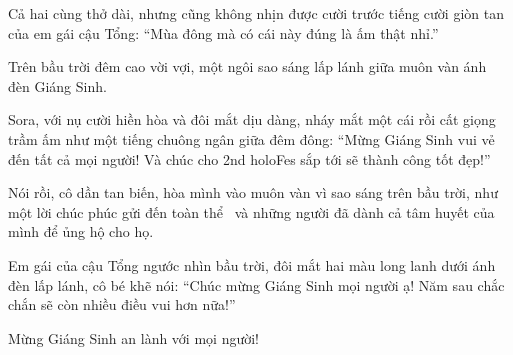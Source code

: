 \documentclass[../main.tex]{subfiles}
\begin{document}
Cả hai cùng thở dài, nhưng cũng không nhịn được cười trước tiếng cười giòn tan của em gái cậu Tổng: ``Mùa đông mà có cái này đúng là ấm thật nhỉ.''

Trên bầu trời đêm cao vời vợi, một ngôi sao sáng lấp lánh giữa muôn vàn ánh đèn Giáng Sinh.

Sora, với nụ cười hiền hòa và đôi mắt dịu dàng, nháy mắt một cái rồi cất giọng trầm ấm như một tiếng chuông ngân giữa đêm đông: ``Mừng Giáng Sinh vui vẻ đến tất cả mọi người! Và chúc cho 2nd holoFes sắp tới sẽ thành công tốt đẹp!''


Nói rồi, cô dần tan biến, hòa mình vào muôn vàn vì sao sáng trên bầu trời, như một lời chúc phúc gửi đến toàn thể \hll\ và những người đã dành cả tâm huyết của mình để ủng hộ cho họ.

Em gái của cậu Tổng ngước nhìn bầu trời, đôi mắt hai màu long lanh dưới ánh đèn lấp lánh, cô bé khẽ nói: ``Chúc mừng Giáng Sinh mọi người ạ! Năm sau chắc chắn sẽ còn nhiều điều vui hơn nữa!''

Mừng Giáng Sinh an lành với mọi người!
\end{document}

